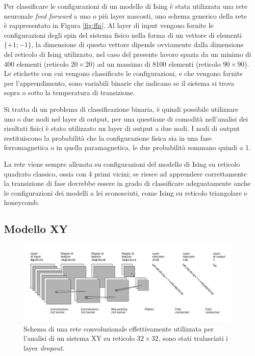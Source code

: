 \documentclass{article}
\begin{document}
Per classificare le configurazioni di un modello di Ising è stata utilizzata una rete neuronale \emph{feed forward} a uno o più layer nascosti, uno schema generico della rete è rappresentato in Figura \ref{fig:ffn}.
Al layer di input vengono fornite le configurazioni degli spin del sistema fisico nella forma di un vettore di elementi $\{+1;-1\}$, la dimensione di questo vettore dipende ovviamente dalla dimensione del reticolo di Ising utilizzato, nel caso del presente lavoro spazia da un minimo di 400 elementi (reticolo $20\times20$) ad un massimo di 8100 elementi (reticolo $90\times90$).
Le etichette con cui vengono classificate le configurazioni, e che vengono fornite per l'apprendimento, sono variabili binarie che indicano se il sistema si trova sopra o sotto la temperatura di transizione.

Si tratta di un problema di classificazione binaria, è quindi possibile utilizzare uno o due nodi nel layer di output, per una questione di comodità nell'analisi dei risultati fisici è stato utilizzato un layer di output a due nodi.
I nodi di output restituiscono la probabilità che la configurazione fisica sia in una fase ferromagnetica o in quella paramagnetica, le due probabilità sommano quindi a 1.

La rete viene sempre allenata su configurazioni del modello di Ising su reticolo quadrato classico, ossia con 4 primi vicini; se riesce ad apprendere correttamente la transizione di fase dovrebbe essere in grado di classificare adeguatamente anche le configurazioni dei modelli a lei sconosciuti, come Ising su reticolo triangolare e honeycomb.

\subsection{Modello XY}

\begin{figure}[ht]
 \centerline{\includegraphics[scale=0.35]{cnn.png}}
 \caption{Schema di una rete convoluzionale effettivamente utilizzata per l'analisi di un sistema XY su reticolo $32\times32$, sono stati tralasciati i layer \emph{dropout}.}
 \label{fig:cnn}
\end{figure}
\end{document}
